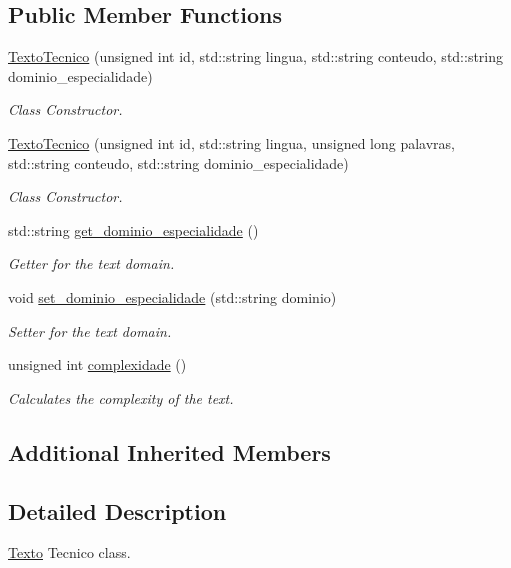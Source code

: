 \subsection*{Public Member Functions}
\begin{DoxyCompactItemize}
\item 
\hyperlink{class_texto_tecnico_a4c770469d3a65f750b4551bef18629a9}{Texto\-Tecnico} (unsigned int id, std\-::string lingua, std\-::string conteudo, std\-::string dominio\-\_\-especialidade)
\begin{DoxyCompactList}\small\item\em Class Constructor. \end{DoxyCompactList}\item 
\hyperlink{class_texto_tecnico_adc11a5c4366f90c1f22fc986c4bc2131}{Texto\-Tecnico} (unsigned int id, std\-::string lingua, unsigned long palavras, std\-::string conteudo, std\-::string dominio\-\_\-especialidade)
\begin{DoxyCompactList}\small\item\em Class Constructor. \end{DoxyCompactList}\item 
std\-::string \hyperlink{class_texto_tecnico_af0541bfc3a8fc861eb13abba28a6768d}{get\-\_\-dominio\-\_\-especialidade} ()
\begin{DoxyCompactList}\small\item\em Getter for the text domain. \end{DoxyCompactList}\item 
void \hyperlink{class_texto_tecnico_af66d0b574c0e3316870fb8fdc3223c74}{set\-\_\-dominio\-\_\-especialidade} (std\-::string dominio)
\begin{DoxyCompactList}\small\item\em Setter for the text domain. \end{DoxyCompactList}\item 
unsigned int \hyperlink{class_texto_tecnico_aeeeff7367e226e4fc0f0d4cdb692e85d}{complexidade} ()
\begin{DoxyCompactList}\small\item\em Calculates the complexity of the text. \end{DoxyCompactList}\end{DoxyCompactItemize}
\subsection*{Additional Inherited Members}


\subsection{Detailed Description}
\hyperlink{class_texto}{Texto} Tecnico class. 

